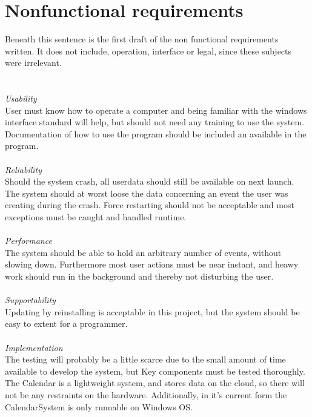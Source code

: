 \section{Nonfunctional requirements}

Beneath this sentence is the first draft of the non functional requirements written. It does not include, operation, interface or legal, since these subjects were irrelevant.
\\ 
\\
\HRule \\[0.4cm]
\emph{Usability} \\ 
User must know how to operate a computer and being familiar with the windows interface standard will help, but should not need any training to use the system. Documentation of how to use the program should be included an available in the program. \\
\HRule \\[0.4cm]
\emph{Reliability} \\
Should the system crash, all userdata should still be available on next launch. The system should at worst loose the data concerning an event the user was creating during the crash. Force restarting should not be acceptable and most exceptions must be caught and handled runtime.\\
\HRule \\[0.4cm]
\emph{Performance} \\
The system should be able to hold an arbitrary number of events, without slowing down. Furthermore most user actions must be near instant, and heawy work should run in the background and thereby not disturbing the user.\\
\HRule \\[0.4cm]
\emph{Supportability} \\
Updating by reinstalling is acceptable in this project, but the system should be easy to extent for a programmer.\\
\HRule \\[0.4cm]
\emph{Implementation}\\
The testing will probably be a little scarce due to the small amount of time available to develop the system, but Key components must be tested thoroughly.  The Calendar is a lightweight system, and stores data on the cloud, so there will not be any restraints on the hardware. Additionally, in it's current form the CalendarSystem is only runnable on Windows OS.\\
\HRule \\[0.4cm]

\newpage